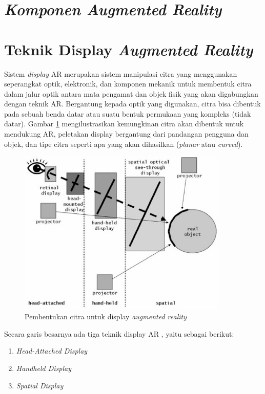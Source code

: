 \section{\textit{Komponen \textit{Augmented Reality}}}
\label{sec:komponen_ar}

\section{Teknik Display \textit{Augmented Reality}}
\label{sec:AR_display}
Sistem \textit{display} AR merupakan sistem manipulasi citra yang menggunakan seperangkat optik, elektronik, dan komponen mekanik untuk membentuk citra dalam jalur optik antara mata pengamat dan objek fisik yang akan digabungkan dengan teknik AR. Bergantung kepada optik yang digunakan, citra bisa dibentuk pada sebuah benda datar atau suatu bentuk permukaan yang kompleks (tidak datar)\cite{Bimber2005}. Gambar \ref{fig:diagram_display_AR} mengilustrasikan kemungkinan citra akan dibentuk untuk mendukung AR, peletakan display bergantung dari pandangan pengguna dan objek, dan tipe citra seperti apa yang akan dihasilkan (\textit{planar} atau \textit{curved}).

\begin{figure}[h]
	\begin{center}
	\includegraphics[width=10cm]{images/diagram_display_AR}
	\caption{\label{fig:diagram_display_AR}Pembentukan citra untuk display \textit{augmented reality}}
	\end{center}
\end{figure}

Secara garis besarnya ada tiga teknik display AR \cite{Bimber2005}, yaitu sebagai berikut:

\begin{enumerate}
\item \textit{Head-Attached Display}
\item \textit{Handheld Display}
\item \textit{Spatial Display}
\end{enumerate}

